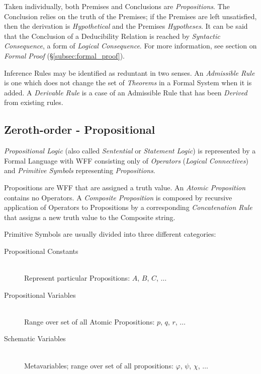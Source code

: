 \documentclass{article}
\begin{document}
Taken individually, both Premises and Conclusions are
\emph{Propositions}. The Conclusion relies on the truth of the
Premises; if the Premises are left unsatisfied, then the derivation is
\emph{Hypothetical} and the Premises \emph{Hypotheses}. It can be said
that the Conclusion of a Deducibility Relation is reached by
\emph{Syntactic Consequence}, a form of \emph{Logical
  Consequence}. For more information, see section on \emph{Formal
  Proof} (\S\ref{subsec:formal_proof}).

Inference Rules may be identified as reduntant in two senses. An
\emph{Admissible Rule} is one which does not change the set of
\emph{Theorems} in a Formal System when it is added. A \emph{Derivable
  Rule} is a case of an Admissible Rule that has been \emph{Derived}
from existing rules.

\subsection{Zeroth-order - Propositional}\label{subsec:propositional}

\emph{Propositional Logic} (also called \emph{Sentential} or
\emph{Statement Logic}) is represented by a Formal Language with WFF
consisting only of \emph{Operators} (\emph{Logical Connectives}) and
\emph{Primitive Symbols} representing \emph{Propositions}.

Propositions are WFF that are assigned a truth value. An \emph{Atomic
  Proposition} contains no Operators. A \emph{Composite Proposition}
is composed by recursive application of Operators to Propositions by a
corresponding \emph{Concatenation Rule} that assigns a new truth value
to the Composite string.

Primitive Symbols are usually divided into three different categories:
\begin{description}
\item[Propositional Constants] \hfill \\
Represent particular Propositions: $A$, $B$, $C$, $\ldots$
\item[Propositional Variables] \hfill \\
Range over set of all Atomic Propositions: $p$, $q$, $r$, $\ldots$
\item[Schematic Variables] \hfill \\
Metavariables; range over set of all propositions: $\varphi$, $\psi$,
$\chi$, $\ldots$
\end{description}
\end{document}

